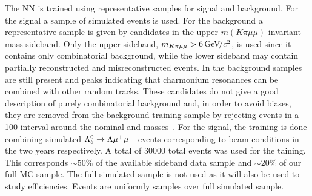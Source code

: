 The NN is trained using representative samples for signal and background. 
For the signal a sample of simulated \Lb\to\Lz\mm events is used. For the background a representative sample
is given by candidates in the upper $m(K\pi\mu\mu)$ invariant mass sideband. Only the upper sideband,
$m_{K\pi\mu\mu} > 6 \gevcc$, is used since it contains only combinatorial background,
while the lower sideband may contain partially reconstructed and misreconstructed events.
In the background samples are still present \jpsi and \psitwos peaks indicating that charmonium resonances
can be combined with other random tracks. These candidates do not give a good description of purely
combinatorial background and, in order to avoid biases, they are removed from the background training
sample by rejecting events in a 100 \mevcc  interval around the nominal \jpsi and \psitwos masses~\cite{PDG2014}.
For the signal, the training is done combining simulated ${{\Lambda}^0_{b}}\rightarrow{\ensuremath{\Lambda}}{\ensuremath{\mu^+\mu^-}}$ events corresponding to beam
conditions in the two years respectively. %
A total of 30000 total events was used for the taining. This corresponds $\sim 50\%$ of the available
sideband data sample and $\sim 20\%$ of our full MC sample. The full simulated sample is not used
as it will also be used to study efficiencies. Events are uniformly samples over full simulated sample.

